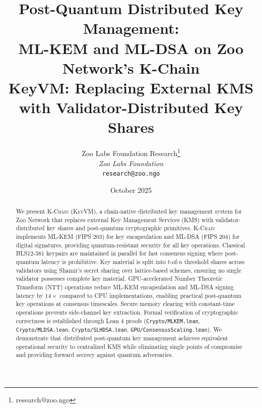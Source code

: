 \documentclass[11pt,letterpaper]{article}
\title{\textbf{Post-Quantum Distributed Key Management:\\ML-KEM and ML-DSA on Zoo Network's K-Chain}\\
\large KeyVM: Replacing External KMS with Validator-Distributed Key Shares}
\author{
Zoo Labs Foundation Research\thanks{research@zoo.ngo}\\
\textit{Zoo Labs Foundation}\\
\texttt{research@zoo.ngo}
}
\date{October 2025}
\theoremstyle{definition}
\theoremstyle{remark}
\newcommand{\KChain}{\textsc{K-Chain}}
\newcommand{\KeyVM}{\textsc{KeyVM}}
\begin{document}
\zoocoverpage

\begin{abstract}
We present \KChain{} (\KeyVM{}), a chain-native distributed key management system for Zoo Network that replaces external Key Management Services (KMS) with validator-distributed key shares and post-quantum cryptographic primitives. \KChain{} implements ML-KEM (FIPS 203) for key encapsulation and ML-DSA (FIPS 204) for digital signatures, providing quantum-resistant security for all key operations. Classical BLS12-381 keypairs are maintained in parallel for fast consensus signing where post-quantum latency is prohibitive. Key material is split into $t$-of-$n$ threshold shares across validators using Shamir's secret sharing over lattice-based schemes, ensuring no single validator possesses complete key material. GPU-accelerated Number Theoretic Transform (NTT) operations reduce ML-KEM encapsulation and ML-DSA signing latency by $14\times$ compared to CPU implementations, enabling practical post-quantum key operations at consensus timescales. Secure memory clearing with constant-time operations prevents side-channel key extraction. Formal verification of cryptographic correctness is established through Lean 4 proofs (\texttt{Crypto/MLKEM.lean}, \texttt{Crypto/MLDSA.lean}, \texttt{Crypto/SLHDSA.lean}, \texttt{GPU/ConsensusScaling.lean}). We demonstrate that distributed post-quantum key management achieves equivalent operational security to centralized KMS while eliminating single points of compromise and providing forward secrecy against quantum adversaries.
\end{abstract}

\tableofcontents
\newpage













\end{document}
